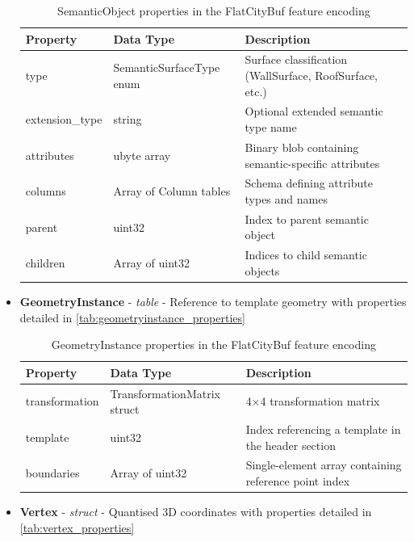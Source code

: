 \begin{itemize}
    \begin{table}[h]
      \centering
      \caption{SemanticObject properties in the FlatCityBuf feature encoding}
      \label{tab:semanticobject_properties}
      \small
      \begin{tabularx}{\textwidth}{@{}llX@{}}
        \toprule
        \textbf{Property} & \textbf{Data Type} & \textbf{Description} \\
        \midrule
        type & SemanticSurfaceType enum & Surface classification (WallSurface, RoofSurface, etc.) \\
        extension\_type & string & Optional extended semantic type name \\
        attributes & ubyte array & Binary blob containing semantic-specific attributes \\
        columns & Array of Column tables & Schema defining attribute types and names \\
        parent & uint32 & Index to parent semantic object \\
        children & Array of uint32 & Indices to child semantic objects \\
        \bottomrule
      \end{tabularx}
    \end{table}

  \item \textbf{GeometryInstance} - \textit{table} - Reference to template geometry with properties detailed in \autoref{tab:geometryinstance_properties}

    \begin{table}[h]
      \centering
      \caption{GeometryInstance properties in the FlatCityBuf feature encoding}
      \label{tab:geometryinstance_properties}
      \small
      \begin{tabularx}{\textwidth}{@{}llX@{}}
        \toprule
        \textbf{Property} & \textbf{Data Type} & \textbf{Description} \\
        \midrule
        transformation & TransformationMatrix struct & 4×4 transformation matrix \\
        template & uint32 & Index referencing a template in the header section \\
        boundaries & Array of uint32 & Single-element array containing reference point index \\
        \bottomrule
      \end{tabularx}
    \end{table}

  \item \textbf{Vertex} - \textit{struct} - Quantised 3D coordinates with properties detailed in \autoref{tab:vertex_properties}


\end{itemize}
